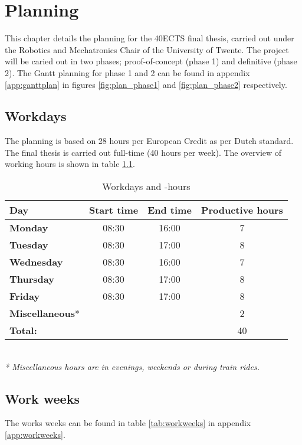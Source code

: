 \chapter{Planning}
\label{ch:Planning}

This chapter details the planning for the 40ECTS final thesis, carried out under the Robotics and Mechatronics Chair of the University of Twente. The project will be caried out in two phases; proof-of-concept (phase 1) and definitive (phase 2). The Gantt planning for phase 1 and 2 can be found in appendix \ref{app:ganttplan} in figures \ref{fig:plan_phase1} and \ref{fig:plan_phase2} respectively.
\section{Workdays}
The planning is based on 28 hours per European Credit as per Dutch standard. The final thesis is carried out full-time (40 hours per week). The overview of working hours is shown in table \ref{tab:workdays}.
\begin{table} [h!]
	\begin{tabular}{l|ccc}
		\textbf{Day} 	&	Start time 		&	End time	&	Productive hours \\
		\hline
		\textbf{Monday} 		&	08:30	&	16:00	& 7 \\
		\rowcolor{Gray}
		\textbf{Tuesday} 	&	08:30 	&	17:00	& 8 \\
		\textbf{Wednesday} 	&	08:30	&	16:00	& 7 \\
		\rowcolor{Gray}
		\textbf{Thursday}	&	08:30	&	17:00	& 8 \\
		\textbf{Friday}		&	08:30	&	17:00	& 8 \\
		\rowcolor{Gray}
		\textbf{Miscellaneous}* & 		& 			& 2 \\
		\hline
		\textbf{Total:} 	&			&			& 40\\
	\end{tabular} \\
	\textit{* Miscellaneous hours are in evenings, weekends or during train rides.}
	\caption{Workdays and -hours}
	\label{tab:workdays}
\end{table}

\section{Work weeks}
The works weeks can be found in table \ref{tab:workweeks} in appendix \ref{app:workweeks}.

